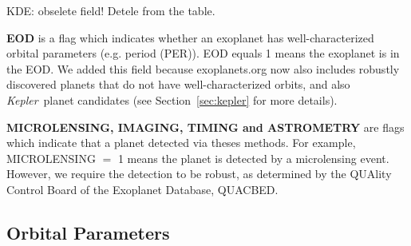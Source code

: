 \documentclass[11pt,preprint]{aastex}
\def\kepler{\textit{Kepler}}
\begin{document}
\begin{CJK*}{UTF8}{gbsn}
\begin{comment}
\textit {Sharon: you need to say what KOI stores. When writing each
  field, keep in mind you need to cover the following so that the
  reader will completely understand: (1) what the field stands for
  (e.g., in case of an abbreviation like KOI); (2) what the field
  physically means, like `KOI' means planet candidates that have
  transit signals as detected by \kepler\ but have not been confirmed,
  and make sure to be thorough at what you say -- sometimes things are
  not that obvious to an outsider reader, e.g., think if a cosmologist
  would understand what you're saying when reading it; (3) what the
  field actually contains, e.g. KOI contains the KOI number designated
  by the \kepler\ team (right?), it is a floating point number, and
  sometimes maybe even worth giving an example, e.g. KOI 30.1 or
  something...; (4) why we added this new field, if this information
  is helpful, or if it's a revised field since \cite{Wright2011}, what
  is changed. Also, use \kepler\ (which is a defined symbol in our
  ms.tex file), instead of typing out Kepler, since you need italic.
  Don't be afraid to write more! Being concise is important, but it's
  always easier to trim down things than to add things on, especially
  for a documentation type of paper like this. Let's be thorough at
  first, then try to reach optimal conciseness.}
 \end{comment}

KDE: obselete field! Detele from the table.

{\bf EOD} is a flag which indicates whether an exoplanet has
well-characterized orbital parameters (e.g. period (PER)). EOD equals
1 means the exoplanet is in the EOD. We added this field because
exoplanets.org now also includes robustly discovered planets that do
not have well-characterized orbits, and also \kepler\ planet
candidates (see Section~\ref{sec:kepler} for more details).

{\bf MICROLENSING, IMAGING, TIMING and ASTROMETRY} are flags which
indicate that a planet detected via theses methods. For example,
MICROLENSING $=$ 1 means the planet is detected by a microlensing
event. However, we require the detection to be robust, as determined
by the QUAlity Control Board of the Exoplanet Database, QUACBED.


\subsection{Orbital Parameters}\label{sec:orbit}


\end{CJK*}
\end{document}
